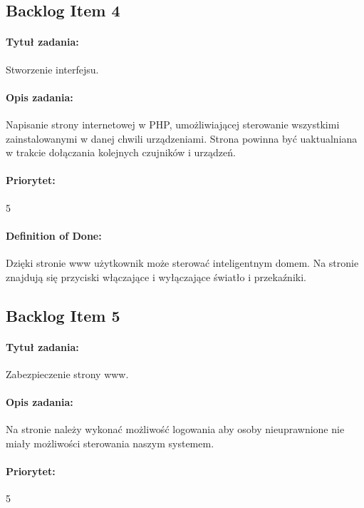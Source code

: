 
	\subsection{Backlog Item 4}
	\paragraph{Tytuł zadania:}
	Stworzenie interfejsu.
	
	\paragraph{Opis zadania:}
	Napisanie strony internetowej w PHP, umożliwiającej sterowanie wszystkimi zainstalowanymi w danej chwili urządzeniami. Strona powinna być uaktualniana w trakcie dołączania kolejnych czujników i urządzeń.
	
	\paragraph{Priorytet:}
	5
	
	\paragraph{Definition of Done:}
	Dzięki stronie www użytkownik może sterować inteligentnym domem. Na stronie znajdują się przyciski włączające i wyłączające światło i przekaźniki.


	\subsection{Backlog Item 5}
	\paragraph{Tytuł zadania:}
	Zabezpieczenie strony www.
	
	\paragraph{Opis zadania:}
	Na stronie należy wykonać możliwość logowania aby osoby nieuprawnione nie miały możliwości sterowania naszym systemem.
	
	\paragraph{Priorytet:}
	5
	
